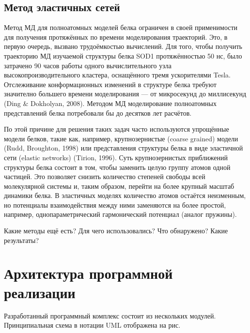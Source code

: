 \subsection{Метод эластичных сетей} \label{subsect_EN}

Метод МД для полноатомных моделей белка ограничен в своей применимости для получения протяжённых по времени моделирования траекторий. Это, в первую очередь, вызвано трудоёмкостью вычислений. Для того, чтобы получить траекторию МД изучаемой структуры белка SOD1 протяжённостью 50 нс, было затрачено 90 часов работы одного вычислительного узла высокопроизводительного кластера, оснащённого тремя ускорителями Tesla. Отслеживание конформационных изменений в структуре белка требуют значително большего времени моделирования — от микросекунд до миллисекунд (Ding \& Dokholyan, 2008). Методом МД моделирование полноатомных представлений белка потребовали бы до десятков лет расчётов. 

По этой причине для решения таких задач часто используются упрощённые модели белков, такие как, например, крупнозернистые (coarse grained) модели (Rudd, Broughton, 1998) или представления структуры белка в виде эластичной сети (elastic networks) (Tirion, 1996). Суть крупнозернистых приближений структуры белка состоит в том, чтобы заменить целую группу атомов одной частицей. Это позволяет снизить количество степеней свободы всей молекулярной системы и, таким образом, перейти на более крупный масштаб динамики белка. В эластичных моделях количество атомов остаётся неизменным, но потенциалы взаимодействия между ними заменяются на более простой, например, однопараметрический гармонический потенциал (аналог пружины).

Какие методы ещё есть? 
Для чего использовались? 
Что обнаружено? 
Какие результаты?

\section{Архитектура программной реализации} \label{sect_architecture}

Разработанный программный комплекс состоит из нескольких модулей. Принципиальная схема в нотации UML отображена на рис.